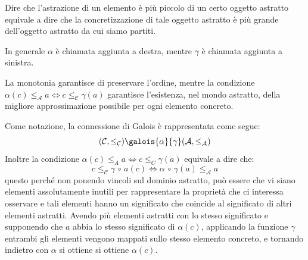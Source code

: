 \begin{figure}[H]
    \centering
\end{figure}
Dire che l'astrazione di un elemento è più piccolo di un certo oggetto 
astratto equivale a dire che la concretizzazione di tale oggetto astratto 
è più grande dell'oggetto astratto da cui siamo partiti.

In generale $\alpha$ è chiamata aggiunta a destra,
mentre $\gamma$ è chiamata aggiunta a sinistra.

La monotonia garantisce di preservare l'ordine, mentre la condizione 
$\alpha(c) \leq_\mathcal{A} a \iff c \leq_\mathcal{C} \gamma(a)$ garantisce l'esistenza,
nel mondo astratto, della migliore approssimazione possibile per 
ogni elemento concreto.

Come notazione, la connessione di Galois è rappresentata
come segue: 
\[(\mathcal{C}, \leq_\mathcal{C}) \galois{\alpha}{\gamma} (\mathcal{A}, \leq_\mathcal{A})\]
Inoltre la condizione $\alpha(c) \leq_A a \iff c \leq_C \gamma(a)$
equivale a dire che:
\[c \leq_\mathcal{C} \gamma \, \circ \, a(c) \iff \alpha \, \circ \, \gamma(a) \leq_\mathcal{A} a\]
questo perché non ponendo vincoli sul dominio astratto, può essere che 
vi siano elementi assolutamente inutili per rappresentare la proprietà
che ci interessa osservare e tali elementi hanno un significato che coincide al significato di 
altri elementi astratti. Avendo più elementi astratti con lo stesso significato e supponendo che 
$a$ abbia lo stesso significato di $\alpha(c)$, applicando la funzione $\gamma$ entrambi gli elementi 
vengono mappati sullo stesso elemento concreto, e tornando indietro con $\alpha$ si ottiene
si ottiene $\alpha(c)$.

